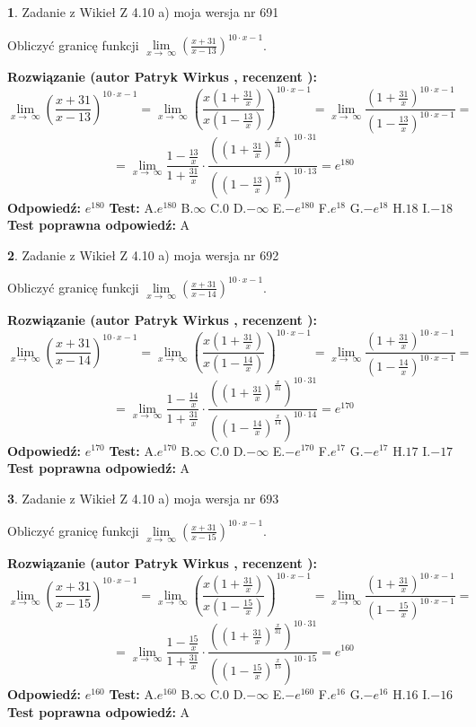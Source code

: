 \documentclass[12pt, a4paper]{article}
\theoremstyle{definition} %
\newtheorem{zad}{}
\newcommand{\zadStart}[1]{\begin{zad}#1\newline}
\newcommand{\zadStop}{\end{zad}}
\newcommand{\rozwStart}[2]{\noindent \textbf{Rozwiązanie (autor #1 , recenzent #2): }\newline}
\newcommand{\rozwStop}{\newline}
\newcommand{\odpStart}{\noindent \textbf{Odpowiedź:}\newline}
\newcommand{\odpStop}{\newline}
\newcommand{\testStart}{\noindent \textbf{Test:}\newline}
\newcommand{\testStop}{\newline}
\newcommand{\kluczStart}{\noindent \textbf{Test poprawna odpowiedź:}\newline}
\newcommand{\kluczStop}{\newline}
\begin{document}
\zadStart{Zadanie z Wikieł Z 4.10 a) moja wersja nr 691}

Obliczyć granicę funkcji  $\lim\limits_{x\to\ \infty}(\frac{x+31}{x-13})^{10\cdot x-1}$.
\zadStop
\rozwStart{Patryk Wirkus}{}
$$\lim\limits_{x\to\ \infty}(\frac{x+31}{x-13})^{10\cdot x-1} = \lim\limits_{x\to\ \infty}(\frac{x(1+\frac{31}{x})}{x(1-\frac{13}{x})})^{10\cdot x-1}=\lim\limits_{x\to\ \infty}\frac{(1+\frac{31}{x})^{10\cdot x-1}}{(1-\frac{13}{x})^{10\cdot x-1}}=$$
$$=\lim\limits_{x\to\ \infty}\frac{1-\frac{13}{x}}{1+\frac{31}{x}}\cdot\frac{((1+\frac{31}{x})^{\frac{x}{31}})^{10\cdot31}}{((1-\frac{13}{x})^{\frac{x}{13}})^{10\cdot13}}=e^{180}$$
\rozwStop
\odpStart
$e^{180}$
\odpStop
\testStart
A.$e^{180}$ B.$\infty$ C.$0$ D.$-\infty$ E.$-e^{180}$
F.$e^{18}$ G.$-e^{18}$
H.$18$
I.$-18$
\testStop
\kluczStart
A
\kluczStop



\zadStart{Zadanie z Wikieł Z 4.10 a) moja wersja nr 692}

Obliczyć granicę funkcji  $\lim\limits_{x\to\ \infty}(\frac{x+31}{x-14})^{10\cdot x-1}$.
\zadStop
\rozwStart{Patryk Wirkus}{}
$$\lim\limits_{x\to\ \infty}(\frac{x+31}{x-14})^{10\cdot x-1} = \lim\limits_{x\to\ \infty}(\frac{x(1+\frac{31}{x})}{x(1-\frac{14}{x})})^{10\cdot x-1}=\lim\limits_{x\to\ \infty}\frac{(1+\frac{31}{x})^{10\cdot x-1}}{(1-\frac{14}{x})^{10\cdot x-1}}=$$
$$=\lim\limits_{x\to\ \infty}\frac{1-\frac{14}{x}}{1+\frac{31}{x}}\cdot\frac{((1+\frac{31}{x})^{\frac{x}{31}})^{10\cdot31}}{((1-\frac{14}{x})^{\frac{x}{14}})^{10\cdot14}}=e^{170}$$
\rozwStop
\odpStart
$e^{170}$
\odpStop
\testStart
A.$e^{170}$ B.$\infty$ C.$0$ D.$-\infty$ E.$-e^{170}$
F.$e^{17}$ G.$-e^{17}$
H.$17$
I.$-17$
\testStop
\kluczStart
A
\kluczStop



\zadStart{Zadanie z Wikieł Z 4.10 a) moja wersja nr 693}

Obliczyć granicę funkcji  $\lim\limits_{x\to\ \infty}(\frac{x+31}{x-15})^{10\cdot x-1}$.
\zadStop
\rozwStart{Patryk Wirkus}{}
$$\lim\limits_{x\to\ \infty}(\frac{x+31}{x-15})^{10\cdot x-1} = \lim\limits_{x\to\ \infty}(\frac{x(1+\frac{31}{x})}{x(1-\frac{15}{x})})^{10\cdot x-1}=\lim\limits_{x\to\ \infty}\frac{(1+\frac{31}{x})^{10\cdot x-1}}{(1-\frac{15}{x})^{10\cdot x-1}}=$$
$$=\lim\limits_{x\to\ \infty}\frac{1-\frac{15}{x}}{1+\frac{31}{x}}\cdot\frac{((1+\frac{31}{x})^{\frac{x}{31}})^{10\cdot31}}{((1-\frac{15}{x})^{\frac{x}{15}})^{10\cdot15}}=e^{160}$$
\rozwStop
\odpStart
$e^{160}$
\odpStop
\testStart
A.$e^{160}$ B.$\infty$ C.$0$ D.$-\infty$ E.$-e^{160}$
F.$e^{16}$ G.$-e^{16}$
H.$16$
I.$-16$
\testStop
\kluczStart
A
\kluczStop
\end{document}
